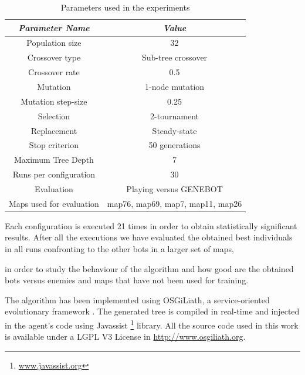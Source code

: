 \documentclass[preprint]{elsarticle}
\begin{document}
\begin{table}
\begin{center}
\begin{tabular}{|c|c|}
\hline
{\em Parameter Name} & {\em Value} \\\hline \hline
Population size & 32 \\\hline
Crossover type & Sub-tree crossover \\ \hline
Crossover rate & 0.5\\ \hline
Mutation  & 1-node mutation\\ \hline
Mutation step-size & 0.25 \\ \hline
Selection & 2-tournament \\ \hline
Replacement & Steady-state\\ \hline
Stop criterion & 50 generations \\ \hline
Maximum Tree Depth & 7  \\ \hline 
Runs per configuration & 30 \\ \hline
Evaluation & Playing versus GENEBOT \cite{Genebot_CEC11}  \\ \hline 
Maps used for evaluation & map76, map69, map7, map11, map26 
\\ \hline
\end{tabular}
\caption{Parameters used in the experiments}
\label{tab:parameters}
\end{center}
\end{table}

Each configuration is executed 21 times in order to obtain statistically significant results.
After all the executions we have evaluated the obtained best individuals in all runs confronting to the other bots in a larger set of maps, 

in order to study the behaviour of the algorithm and how good are the obtained bots versus enemies and maps that have not been used for training.

The algorithm has been implemented using OSGiLiath, a service-oriented evolutionary framework \cite{Garcia13Service}. 
The generated tree is compiled in real-time and injected in the agent's code using Javassist \footnote{\url{www.javassist.org}} library. All the source code used in this work is available under a LGPL V3 License in \url{http://www.osgiliath.org}.



\end{document}
